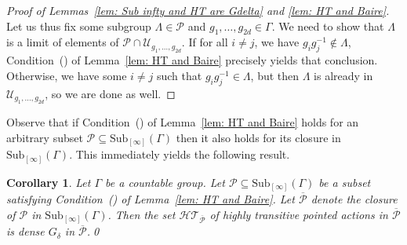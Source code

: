 \documentclass[12pt]{article}
\numberwithin{equation}{section}
\newtheorem{corollary}[equation]{Corollary}
\theoremstyle{definition}
\newcommand{\inv}{^{-1}}
\newcommand{\Sub}{\mathrm{Sub}}
\begin{document}
\begin{proof}[Proof of Lemmas~\ref{lem: Sub infty and HT are Gdelta} and \ref{lem: HT and Baire}]
	Let us thus fix some subgroup \(\Lambda\in\mathcal P\) and \( g_1,\dots,g_{2d}\in\Gamma \). We need to show that \( \Lambda \) is a limit of elements of \(\mathcal P\cap \mathcal U_{g_1,\dots,g_{2d}}\).
	If for all \(i\neq j\), we have \( g_i g_j\inv\not\in\Lambda \),  Condition~(\textasteriskcentered) of Lemma~\ref{lem: HT and Baire} precisely yields that conclusion.
	Otherwise, we have some \(i\neq j\) such that \( g_i g_j\inv\in\Lambda \), but then 
	\( \Lambda \) is already in \(\mathcal U_{g_1,\dots,g_{2d}}\), so we are done as well.
\end{proof}

Observe that if  Condition~(\textasteriskcentered) of Lemma~\ref{lem: HT and Baire} holds
for an arbitrary subset \(\mathcal P\subseteq \Sub_{[\infty]}(\Gamma)\)
then it also holds for its closure in \(\Sub_{[\infty]}(\Gamma)\).
This immediately yields the following result.

\begin{corollary}\label{cor: HT via dense set}
	Let \( \Gamma \) be a countable group. 
	Let \(\mathcal P \subseteq \Sub_{[\infty]}(\Gamma)\) be a subset satisfying  Condition~(\textasteriskcentered) of Lemma~\ref{lem: HT and Baire}.
	Let \(\overline{\mathcal P}\) denote the closure of \(\mathcal P\) in
	\( \Sub_{[\infty]}(\Gamma) \).
	Then the set \(\mathcal{HT}_{\overline{\mathcal P}}\) of highly transitive pointed actions 
	in \(\overline{\mathcal P}\) is dense \( G_\delta \) in \(\overline{\mathcal P}\).\qed{}
\end{corollary}
\end{document}
